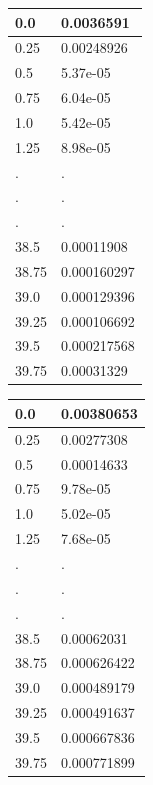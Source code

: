 \documentclass[a4paper, 12pt]{article}
\begin{document}
\begin{center}
\begin{tabular}{|l|l|}\hline
0.0&0.0036591\\ \hline
0.25&0.00248926\\ \hline
0.5&5.37e-05\\ \hline
0.75&6.04e-05\\ \hline
1.0&5.42e-05\\ \hline
1.25&8.98e-05\\ \hline
.&.\\
.&.\\
.&.\\
38.5&0.00011908\\ \hline
38.75&0.000160297\\ \hline
39.0&0.000129396\\ \hline
39.25&0.000106692\\ \hline
39.5&0.000217568\\ \hline
39.75&0.00031329\\ \hline
	\end{tabular}
\end{center}
\newpage
\begin{center}
\begin{tabular}{|l|l|}\hline
0.0&0.00380653\\ \hline
0.25&0.00277308\\ \hline
0.5&0.00014633\\ \hline
0.75&9.78e-05\\ \hline
1.0&5.02e-05\\ \hline
1.25&7.68e-05\\ \hline
.&.\\
.&.\\
.&.\\
38.5&0.00062031\\ \hline
38.75&0.000626422\\ \hline
39.0&0.000489179\\ \hline
39.25&0.000491637\\ \hline
39.5&0.000667836\\ \hline
39.75&0.000771899\\ \hline
	\end{tabular}
\end{center}
\end{document}
